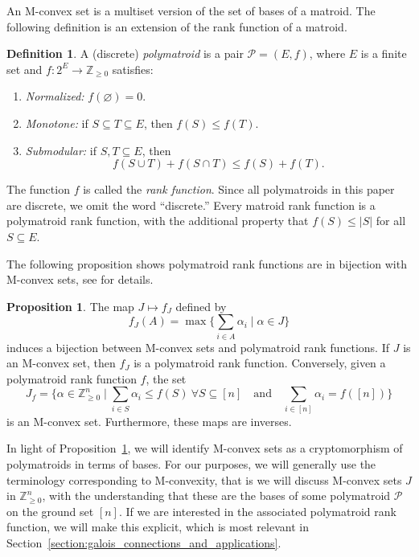 \documentclass[11pt]{article}
\theoremstyle{definition}
\newtheorem{proposition}[theorem]{Proposition}
\newtheorem{definition}[theorem]{Definition}
\theoremstyle{remark}
\newcommand{\Zgeq}{\mathbb{Z}_{\geq 0}}       %
\newcommand{\Zgeqn}{\mathbb{Z}_{\geq 0}^n}     %
\begin{document}
An M-convex set is a multiset version of the set of bases of a matroid. The following definition is an extension of the rank function of a matroid. 
\begin{definition}
    A (discrete) \emph{polymatroid} is a pair $\mathcal{P}=(E,f)$, where $E$ is a finite set and $f\colon 2^E\to\Zgeq$ satisfies:
    \begin{enumerate}
        \item \emph{Normalized:} $f(\varnothing)=0$.

        \item \emph{Monotone:} if $S\subseteq T\subseteq E$, then $f(S)\leq f(T)$.

        \item \emph{Submodular:} if $S,T\subseteq E$, then
        \[
            f(S\cup T)+f(S\cap T)\leq f(S)+f(T).
        \]
    \end{enumerate}
\end{definition}
The function $f$ is called the \emph{rank function}. Since all polymatroids in this paper are discrete, we omit the word ``discrete.'' Every matroid rank function is a polymatroid rank function, with the additional property that $f(S)\leq |S|$ for all $S\subseteq E$.

The following proposition shows polymatroid rank functions are in bijection with M-convex sets, see \cite{herzog2003discretepolymatroids} for details.
\begin{proposition} \label{prop:M_convex_to_rank}
    The map $J \mapsto f_J$ defined by
    \[
    f_J(A) = \max \big\{ \sum_{i\in A} \alpha_i \mid \alpha \in J \big\}
    \]
    induces a bijection between M-convex sets and polymatroid rank functions. If $J$ is an M-convex set, then $f_J$ is a polymatroid rank function. Conversely, given a polymatroid rank function $f$, the set
    \[
    J_f = \big\{ \alpha \in \Zgeqn \mid \sum_{i \in S} \alpha_i \leq f(S)\ \forall S \subseteq [n] \quad \text{and} \quad \sum_{i \in [n]}\alpha_i = f([n]) \big\}
    \]
    is an M-convex set. Furthermore, these maps are inverses.
\end{proposition}

In light of Proposition~\ref{prop:M_convex_to_rank}, we will identify M-convex sets as a cryptomorphism of polymatroids in terms of bases. For our purposes, we will generally use the terminology corresponding to M-convexity, that is we will discuss M-convex sets $J$ in $\Zgeqn$, with the understanding that these are the bases of some polymatroid $\mathcal{P}$ on the ground set $[n]$. If we are interested in the associated polymatroid rank function, we will make this explicit, which is most relevant in Section~\ref{section:galois_connections_and_applications}. 
\end{document}
